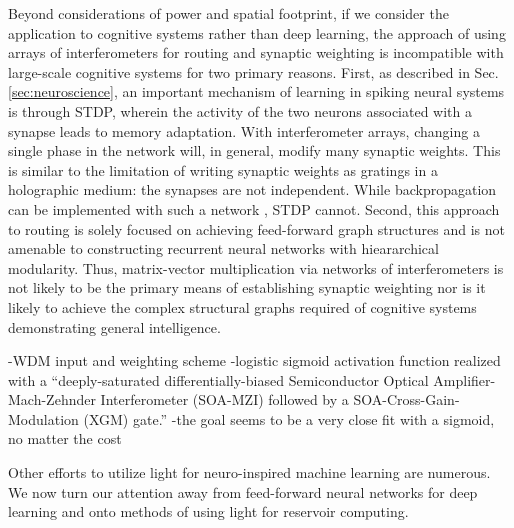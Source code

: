 Beyond considerations of power and spatial footprint, if we consider the application to cognitive systems rather than deep learning, the approach of using arrays of interferometers for routing and synaptic weighting is incompatible with large-scale cognitive systems for two primary reasons. First, as described in Sec.\,\ref{sec:neuroscience}, an important mechanism of learning in spiking neural systems is through STDP, wherein the activity of the two neurons associated with a synapse leads to memory adaptation. With interferometer arrays, changing a single phase in the network will, in general, modify many synaptic weights. This is similar to the limitation of writing synaptic weights as gratings in a holographic medium: the synapses are not independent. While backpropagation can be implemented with such a network \cite{humi2018}, STDP cannot. Second, this approach to routing is solely focused on achieving feed-forward graph structures and is not amenable to constructing recurrent neural networks with hieararchical modularity. Thus, matrix-vector multiplication via networks of interferometers is not likely to be the primary means of establishing synaptic weighting nor is it likely to achieve the complex structural graphs required of cognitive systems demonstrating general intelligence.


\cite{mots2019}
-WDM input and weighting scheme
-logistic sigmoid activation function realized with a ``deeply-saturated differentially-biased Semiconductor Optical Amplifier-Mach-Zehnder Interferometer (SOA-MZI) followed by a SOA-Cross-Gain-Modulation (XGM) gate.''
-the goal seems to be a very close fit with a sigmoid, no matter the cost


Other efforts to utilize light for neuro-inspired machine learning are numerous. We now turn our attention away from feed-forward neural networks for deep learning and onto methods of using light for reservoir computing.

